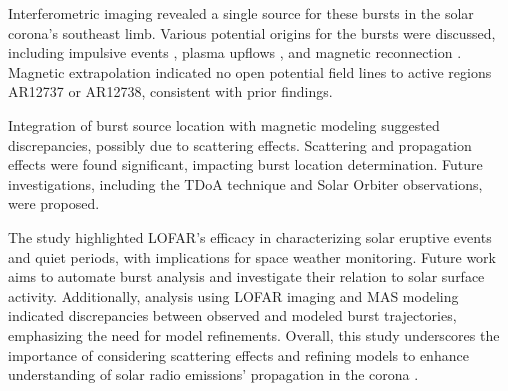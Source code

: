 Interferometric imaging revealed a single source for these bursts in the solar corona's southeast limb. Various potential origins for the bursts were discussed, including impulsive events \citep{ishikawa_2017, che_2018, chhabra_2021}, plasma upflows \citep{harra_2021}, and magnetic reconnection \citep{gopalswamy_2022}. Magnetic extrapolation indicated no open potential field lines to active regions AR12737 or AR12738, consistent with prior findings.

Integration of burst source location with magnetic modeling suggested discrepancies, possibly due to scattering effects. Scattering and propagation effects were found significant, impacting burst location determination. Future investigations, including the TDoA technique and Solar Orbiter observations, were proposed.

The study highlighted LOFAR's efficacy in characterizing solar eruptive events and quiet periods, with implications for space weather monitoring. Future work aims to automate burst analysis and investigate their relation to solar surface activity.
Additionally, analysis using LOFAR imaging and MAS modeling indicated discrepancies between observed and modeled burst trajectories, emphasizing the need for model refinements.
Overall, this study underscores the importance of considering scattering effects and refining models to enhance understanding of solar radio emissions' propagation in the corona \citep{kontar_2019, kontar_2023, chen_2023}.